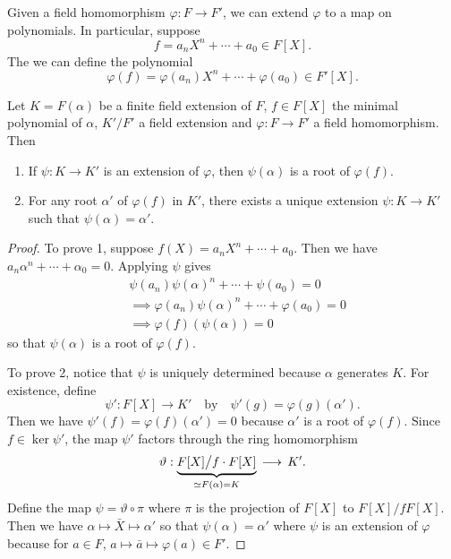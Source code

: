 \begin{rem}
	Given a field homomorphism $\varphi: F \to F'$, we can extend $\varphi$ to a map on polynomials. In particular, suppose
	\[
		f = a_n X^n + \cdots + a_0 \in F[X].
	\]
	The we can define the polynomial
	\[
		\varphi(f) = \varphi(a_n) X^n + \cdots + \varphi(a_0) \in F'[X].
	\]
\end{rem}

\begin{prop}
	Let $K = F(\alpha)$ be a finite field extension of $F$, $f \in F[X]$ the minimal polynomial of $\alpha$, $K' / F'$ a field extension and $\varphi : F \to F'$ a field homomorphism. Then
	\begin{enumerate}
		\item If $\psi : K \to K'$ is an extension of $\varphi$, then $\psi(\alpha)$ is a root of $\varphi(f)$.
		\item For any root $\alpha'$ of $\varphi(f)$ in $K'$, there exists a unique extension $\psi : K \to K'$ such that $\psi(\alpha) = \alpha'$.
	\end{enumerate}
\end{prop}
\begin{proof}
	To prove 1, suppose $f(X) = a_n X^n + \cdots + a_0$. Then we have $a_n \alpha^n + \cdots + \alpha_0 = 0$. Applying $\psi$ gives
	\begin{align*}
		& \psi(a_n)\psi(\alpha)^n + \cdots + \psi(a_0) = 0\\
		&\implies \varphi(a_n)\psi(\alpha)^n + \cdots + \varphi(a_0) = 0\\
		&\implies \varphi(f)(\psi(\alpha)) = 0
	\end{align*}
	so that $\psi(\alpha)$ is a root of $\varphi(f)$.
	
	To prove 2, notice that $\psi$ is uniquely determined because $\alpha$ generates $K$. For existence, define 
	\[
		\psi' : F[X] \to K' \quad \text{by} \quad \psi'(g) = \varphi(g)(\alpha').
	\]
	Then we have $\psi'(f) = \varphi(f)(\alpha') = 0$ because $\alpha'$ is a root of $\varphi(f)$. Since $f \in \ker \psi'$, the map $\psi'$ factors through the ring homomorphism
	\[
		\vartheta : \underset{\simeq F(\alpha) = K}{\underbrace{F[X] \big / f \cdot F[X]}} \,\longrightarrow\, K'.
	\]
	Define the map $\psi = \vartheta \circ \pi$ where $\pi$ is the projection of $F[X]$ to $F[X] / f F[X]$. Then we have $\alpha \mapsto \bar X \mapsto \alpha'$ so that $\psi(\alpha) = \alpha'$ where $\psi$ is an extension of $\varphi$ because for $a \in F$, $a \mapsto \bar a \mapsto \varphi(a) \in F'$.
\end{proof}

